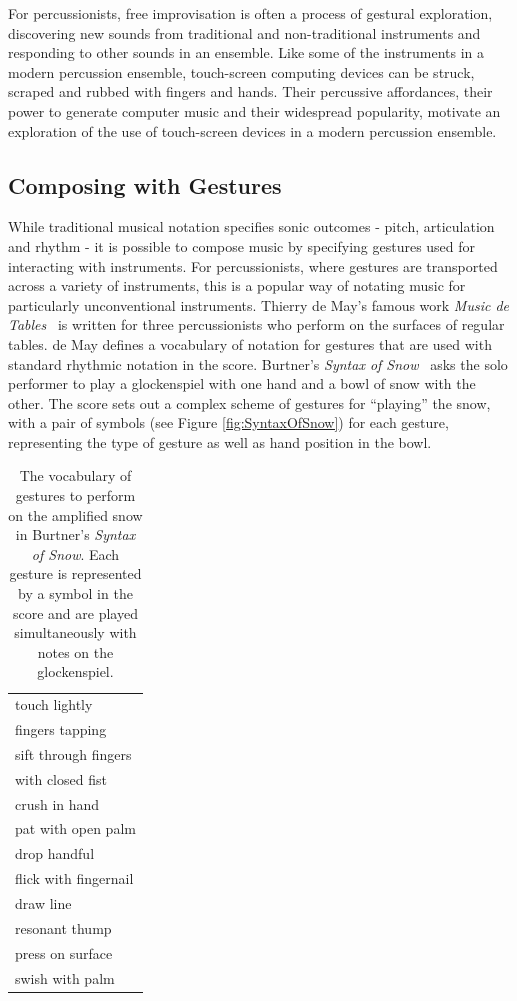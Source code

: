 \documentclass[graybox]{svmult}
\begin{document}
For percussionists, free improvisation is often a process of gestural
exploration, discovering new sounds from traditional and
non-traditional instruments and responding to other sounds in an
ensemble. Like some of the instruments in a modern percussion
ensemble, touch-screen computing devices can be struck, scraped and
rubbed with fingers and hands. Their percussive affordances, their
power to generate computer music and their widespread popularity,
motivate an exploration of the use of touch-screen devices in a modern
percussion ensemble.

\subsection{Composing with Gestures}

While traditional musical notation specifies sonic outcomes - pitch,
articulation and rhythm - it is possible to compose music by
specifying gestures used for interacting with instruments. For
percussionists, where gestures are transported across a variety of
instruments, this is a popular way of notating music for particularly
unconventional instruments. Thierry de May's famous work \emph{Music
de Tables}~\cite{May:1987fk} is written for three percussionists who
perform on the surfaces of regular tables. de May defines a vocabulary
of notation for gestures that are used with standard rhythmic notation
in the score. Burtner's \emph{Syntax of Snow}~\cite{Burtner:2011fk}
asks the solo performer to play a glockenspiel with one hand and a
bowl of snow with the other. The score sets out a complex scheme of
gestures for ``playing'' the snow, with a pair of symbols (see Figure
\ref{fig:SyntaxOfSnow}) for each gesture, representing the type of
gesture as well as hand position in the bowl.

\begin{table}\centering
\begin{tabular}{|l|}
\hline
touch lightly \\
fingers tapping \\
sift through fingers \\
with closed fist\\
crush in hand\\
pat with open palm\\
drop handful\\
flick with fingernail\\
draw line\\
resonant thump\\
press on surface\\
swish with palm\\
\hline
\end{tabular}
\label{tab:SyntaxOfSnowGestures}
\caption{The vocabulary of gestures to perform on the amplified snow
  in Burtner's \emph{Syntax of Snow}. Each gesture is represented by a
  symbol in the score and are played simultaneously with notes on the glockenspiel.}
\end{table}
\end{document}
